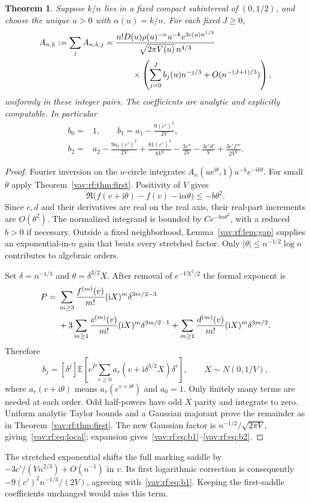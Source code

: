 \documentclass[11pt]{article}
\newtheorem{theorem}{Theorem}[section]
\theoremstyle{remark}\newtheorem{remark}[theorem]{Remark}
\newcommand{\E}{\mathbb E}
\newcommand{\ii}{\mathrm i}
\begin{document}
\begin{theorem}\label{vav:rf:thm:local}
Suppose $k/n$ lies in a fixed compact subinterval of $(0,1/2)$, and choose the unique $u>0$ with $\alpha(u)=k/n$. For each fixed $J\ge0$,
\begin{align}\label{vav:rf:eq:local}
 A_{n,k}:=\sum_jA_{n,k,j}
 ={}&\frac{n!D(u)\rho(u)^{-n}u^{-k}e^{3c(u)n^{1/3}}}
             {\sqrt{2\pi V(u)}\,n^{4/3}}\notag\\
 &\qquad\times\left(\sum_{j=0}^J b_j(u)n^{-j/3}
                      +O(n^{-(J+1)/3})\right),
\end{align}
uniformly in these integer pairs. The coefficients are analytic and explicitly computable. In particular
\begin{align}
 b_0={}&1,\qquad b_1=a_1-\frac{9(c')^2}{2V},\label{vav:rf:eq:b1}\\
 b_2={}&a_2-\frac{9a_1(c')^2}{2V}+\frac{81(c')^4}{8V^2}
       -\frac{3c''}{2V}-\frac{3c'd'}{V}+\frac{3c'f'''}{2V^2}.\label{vav:rf:eq:b2}
\end{align}
\end{theorem}
\begin{proof}
Fourier inversion on the $u$-circle integrates $A_n(u e^{\ii\theta},1)u^{-k}e^{-\ii k\theta}$. For small $\theta$ apply Theorem~\ref{vav:rf:thm:first}. Positivity of $V$ gives
\[
 \Re\big(f(v+\ii\theta)-f(v)-\ii\alpha\theta\big)\le-b\theta^2.
\]
Since $c,d$ and their derivatives are real on the real axis, their real-part increments are $O(\theta^2)$. The normalized integrand is bounded by $C e^{-bn\theta^2}$, with a reduced $b>0$ if necessary. Outside a fixed neighborhood, Lemma~\ref{vav:rf:lem:gap} supplies an exponential-in-$n$ gain that beats every stretched factor. Only $|\theta|\le n^{-1/2}\log n$ contributes to algebraic orders.

Set $\delta=n^{-1/3}$ and $\theta=\delta^{3/2}X$. After removal of $e^{-VX^2/2}$ the formal exponent is
\begin{align}\label{vav:rf:eq:P}
 P={}&\sum_{m\ge3}\frac{f^{(m)}(v)}{m!}(\ii X)^m\delta^{3m/2-3}\notag\\
 &+3\sum_{m\ge1}\frac{c^{(m)}(v)}{m!}(\ii X)^m\delta^{3m/2-1}
 +\sum_{m\ge1}\frac{d^{(m)}(v)}{m!}(\ii X)^m\delta^{3m/2}.
\end{align}
Therefore
\begin{equation}\label{vav:rf:eq:bgen}
 b_j=[\delta^j]\E\left[e^P
        \sum_{r\ge0}a_r(v+\ii\delta^{3/2}X)\delta^r\right],
 \qquad X\sim N(0,1/V),
\end{equation}
where $a_r(v+\ii\theta)$ means $a_r(e^{v+\ii\theta})$ and $a_0=1$.
Only finitely many terms are needed at each order. Odd half-powers have odd $X$ parity and integrate to zero. Uniform analytic Taylor bounds and a Gaussian majorant prove the remainder as in Theorem~\ref{vav:rf:thm:first}. The new Gaussian factor is $n^{-1/2}/\sqrt{2\pi V}$, giving~\eqref{vav:rf:eq:local}; expansion gives~\eqref{vav:rf:eq:b1}--\eqref{vav:rf:eq:b2}.
\end{proof}
The stretched exponential shifts the full marking saddle by
$-3c'/(Vn^{2/3})+O(n^{-1})$ in $v$. Its first logarithmic correction is consequently $-9(c')^2n^{-1/3}/(2V)$, agreeing with~\eqref{vav:rf:eq:b1}. Keeping the first-saddle coefficients unchanged would miss this term.
\end{document}
